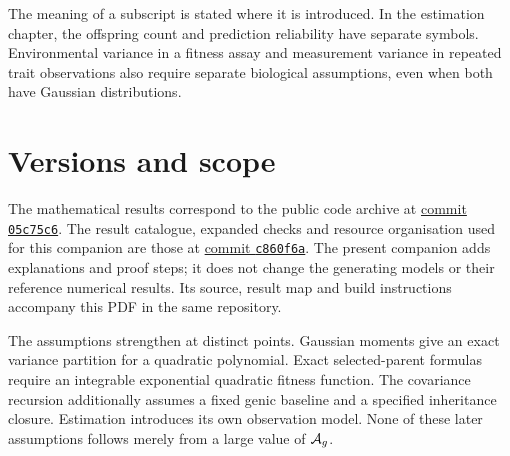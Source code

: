 The meaning of a subscript is stated where it is introduced. In the estimation chapter, the offspring count and prediction reliability have separate symbols. Environmental variance in a fitness assay and measurement variance in repeated trait observations also require separate biological assumptions, even when both have Gaussian distributions.

\section*{Versions and scope}
The mathematical results correspond to the public code archive at \href{https://github.com/dortizbarrientos/additive_channels/tree/05c75c6ee4335513b217f3026bf6e43ccbd0f62b}{commit \texttt{05c75c6}}. The result catalogue, expanded checks and resource organisation used for this companion are those at \href{https://github.com/dortizbarrientos/additive_channels/tree/c860f6a1373be310a59502e244effe75e0e622be}{commit \texttt{c860f6a}}. The present companion adds explanations and proof steps; it does not change the generating models or their reference numerical results. Its source, result map and build instructions accompany this PDF in the same repository.

The assumptions strengthen at distinct points. Gaussian moments give an exact variance partition for a quadratic polynomial. Exact selected-parent formulas require an integrable exponential quadratic fitness function. The covariance recursion additionally assumes a fixed genic baseline and a specified inheritance closure. Estimation introduces its own observation model. None of these later assumptions follows merely from a large value of $\mathcal A_g$.
